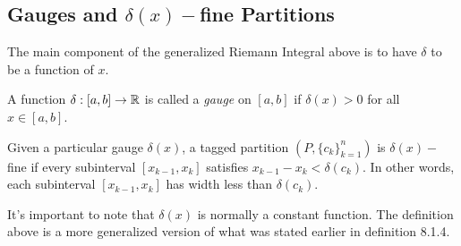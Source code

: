 \subsection{Gauges and \( \delta(x)- \)fine Partitions}

The main component of the generalized Riemann Integral above is to have \( \delta  \) to be a function of \( x  \). 

\begin{definition}[Gauges]
    A function \( \delta: [a,b] \to \mathbb{R}  \) is called a \textit{gauge} on \( [a,b]  \) if \( \delta(x) > 0  \) for all \( x \in [a,b]  \).
\end{definition}

\begin{definition}
    Given a particular gauge \( \delta (x)  \), a tagged partition \( (P, \{ c_{k }  \}_{k=1}^{n} ) \) is \( \delta(x)- \)fine if every subinterval \( [x_{k-1}, x_{k }] \) satisfies \( x_{k-1} - x_{k } < \delta(c_{k})  \). In other words, each subinterval \( [x_{k-1}, x_{k} ] \) has width less than \( \delta(c_{k }) \). 
\end{definition}

It's important to note that \( \delta(x)  \) is normally a constant function. The definition above is a more generalized version of what was stated earlier in definition 8.1.4. 


